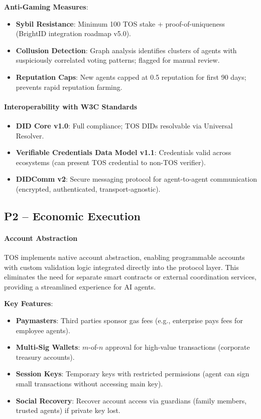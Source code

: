 \documentclass[11pt]{article}
\begin{document}
\textbf{Anti-Gaming Measures}:
\begin{itemize}[noitemsep]
  \item \textbf{Sybil Resistance}: Minimum 100 TOS stake + proof-of-uniqueness (BrightID integration roadmap v5.0).
  \item \textbf{Collusion Detection}: Graph analysis identifies clusters of agents with suspiciously correlated voting patterns; flagged for manual review.
  \item \textbf{Reputation Caps}: New agents capped at 0.5 reputation for first 90 days; prevents rapid reputation farming.
\end{itemize}

\paragraph{Interoperability with W3C Standards}
\begin{itemize}[noitemsep]
  \item \textbf{DID Core v1.0}: Full compliance; TOS DIDs resolvable via Universal Resolver.
  \item \textbf{Verifiable Credentials Data Model v1.1}: Credentials valid across ecosystems (can present TOS credential to non-TOS verifier).
  \item \textbf{DIDComm v2}: Secure messaging protocol for agent-to-agent communication (encrypted, authenticated, transport-agnostic).
\end{itemize}

\subsection{P2 -- Economic Execution}
\label{sec:pillar-economic}

\paragraph{Account Abstraction}
TOS implements native account abstraction, enabling programmable accounts with custom validation logic integrated directly into the protocol layer. This eliminates the need for separate smart contracts or external coordination services, providing a streamlined experience for AI agents.

\textbf{Key Features}:
\begin{itemize}[noitemsep]
  \item \textbf{Paymasters}: Third parties sponsor gas fees (e.g., enterprise pays fees for employee agents).
  \item \textbf{Multi-Sig Wallets}: $m$-of-$n$ approval for high-value transactions (corporate treasury accounts).
  \item \textbf{Session Keys}: Temporary keys with restricted permissions (agent can sign small transactions without accessing main key).
  \item \textbf{Social Recovery}: Recover account access via guardians (family members, trusted agents) if private key lost.
\end{itemize}
\end{document}
